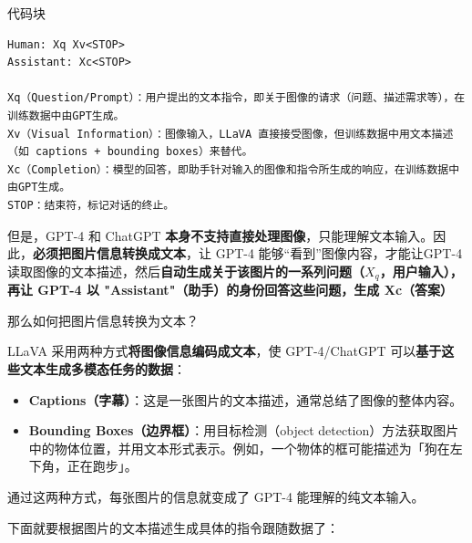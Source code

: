 \documentclass[zihao=false,fontset=windows]{ctexart}
\newcommand{\codehead}{{\small\ttfamily\color{feishuGray}代码块}\par\vspace{-0.15em}}
\newcommand{\hpink}[1]{\colorbox{feishuPinkBg}{#1}}
\begin{document}
\begin{feishucode}
\codehead
\begin{lstlisting}
Human: Xq Xv<STOP>
Assistant: Xc<STOP>

Xq（Question/Prompt）：用户提出的文本指令，即关于图像的请求（问题、描述需求等），在训练数据中由GPT生成。
Xv（Visual Information）：图像输入，LLaVA 直接接受图像，但训练数据中用文本描述（如 captions + bounding boxes）来替代。
Xc（Completion）：模型的回答，即助手针对输入的图像和指令所生成的响应，在训练数据中由GPT生成。
STOP：结束符，标记对话的终止。
\end{lstlisting}
\end{feishucode}

\begin{feishuquote}
但是，GPT-4 和 ChatGPT \textbf{本身不支持直接处理图像}，只能理解文本输入。因此，\textbf{必须把图片信息转换成文本}，让 GPT-4 能够“看到”图像内容，才能让GPT-4 读取图像的文本描述，然后\textbf{自动生成关于该图片的一系列问题（}$X_q$\textbf{，用户输入），再让 GPT-4 以 "Assistant"（助手）的身份回答这些问题，生成 Xc（答案）}\par
那么如何把图片信息转换为文本？\par
\end{feishuquote}

\begin{feishusoft}
LLaVA 采用两种方式\textbf{将图像信息编码成文本}，使 GPT-4/ChatGPT 可以\textbf{基于这些文本生成多模态任务的数据}：\par
\end{feishusoft}
\begin{itemize}
\item \hpink{\textbf{Captions（字幕）}}：这是一张图片的文本描述，通常总结了图像的整体内容。
\item \hpink{\textbf{Bounding Boxes（边界框）}}：用目标检测（object detection）方法获取图片中的物体位置，并用文本形式表示。例如，一个物体的框可能描述为「狗在左下角，正在跑步」。
\end{itemize}

\begin{feishuquote}
通过这两种方式，每张图片的信息就变成了 GPT-4 能理解的纯文本输入。\par
\end{feishuquote}

\begin{feishusoft}
下面就要根据图片的文本描述生成具体的指令跟随数据了：\par
\end{feishusoft}
\end{document}
